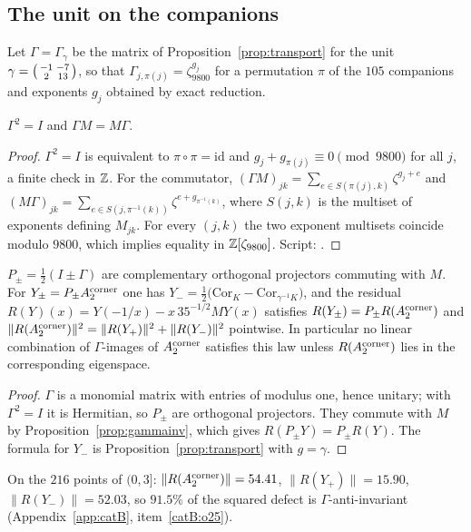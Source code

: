\subsection{The unit on the companions}\label{sec:gammacomp}
Let $\Gamma=\Gamma_\gamma$ be the matrix of Proposition~\ref{prop:transport} for the unit $\gamma=\begin{psmallmatrix}-1&-7\\2&13\end{psmallmatrix}$, so that $\Gamma_{j,\pi(j)}=\zeta_{9800}^{g_j}$ for a
permutation $\pi$ of the $105$ companions and exponents $g_j$ obtained by exact reduction.
\begin{proposition}\label{prop:gammainv}
$\Gamma^2=I$ and $\Gamma M=M\Gamma$.
\end{proposition}
\begin{proof}
$\Gamma^2=I$ is equivalent to $\pi\circ\pi=\mathrm{id}$ and $g_j+g_{\pi(j)}\equiv0\pmod{9800}$ for all $j$, a finite check in $\mathbb{Z}$. For the commutator,
$(\Gamma M)_{jk}=\sum_{e\in S(\pi(j),k)}\zeta^{g_j+e}$ and $(M\Gamma)_{jk}=\sum_{e\in S(j,\pi^{-1}(k))}\zeta^{e+g_{\pi^{-1}(k)}}$, where $S(j,k)$ is the multiset of exponents
defining $M_{jk}$. For every $(j,k)$ the two exponent multisets coincide modulo $9800$, which implies equality in $\mathbb{Z}[\zeta_{9800}]$. Script:
.
\end{proof}
\begin{corollary}\label{cor:split}
$P_\pm=\frac12(I\pm\Gamma)$ are complementary orthogonal projectors commuting with $M$. For $Y_\pm=P_\pm A_2^{\rm corner}$ one has
$Y_-=\frac12\big(\mathrm{Cor}_K-\mathrm{Cor}_{\gamma^{-1}K}\big)$, and the residual $R(Y)(x)=Y(-1/x)-x\,35^{-1/2}MY(x)$ satisfies $R(Y_\pm)=P_\pm R(A_2^{\rm corner})$ and
$\|R(A_2^{\rm corner})\|^2=\|R(Y_+)\|^2+\|R(Y_-)\|^2$ pointwise. In particular no linear combination of $\Gamma$-images of $A_2^{\rm corner}$ satisfies this law unless
$R(A_2^{\rm corner})$ lies in the corresponding eigenspace.
\end{corollary}
\begin{proof}
$\Gamma$ is a monomial matrix with entries of modulus one, hence unitary; with $\Gamma^2=I$ it is Hermitian, so $P_\pm$ are orthogonal projectors. They commute with $M$ by
Proposition~\ref{prop:gammainv}, which gives $R(P_\pm Y)=P_\pm R(Y)$. The formula for $Y_-$ is Proposition~\ref{prop:transport} with $g=\gamma$.
\end{proof}
\begin{catbremark}
On the $216$ points of $(0,3]$: $\|R(A_2^{\rm corner})\|=54.41$, $\|R(Y_+)\|=15.90$, $\|R(Y_-)\|=52.03$, so $91.5\%$ of the squared defect is $\Gamma$-anti-invariant
(Appendix~\ref{app:catB}, item~\ref{catB:o25}).
\end{catbremark}
